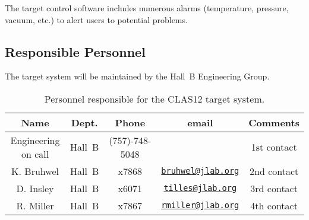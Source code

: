 The target control software includes numerous alarms (temperature, pressure, vacuum, etc.) 
to alert users to potential problems. 

\subsection{Responsible Personnel}

The target system will be maintained by the Hall~B Engineering Group.  

\begin{table}[!htb]
\centering
\begin{tabular}{|c|c|c|c|c|}
\hline
 Name&Dept.&Phone&email&Comments \\ \hline
Engineering on call & Hall~B&(757)-748-5048&& 1st contact  \\ \hline
K. Bruhwel& Hall~B&x7868&\href{mailto:bruhwel@jlab.org}{\nolinkurl{bruhwel@jlab.org}}&2nd contact \\ \hline
D. Insley & Hall~B&x6071&\href{mailto:tilles@jlab.org}{\nolinkurl{tilles@jlab.org}}  &3rd contact \\ \hline
R. Miller &Hall~B&x7867&\href{mailto:rmiller@jlab.org}{\nolinkurl{rmiller@jlab.org}} &4th contact \\ \hline
\end{tabular}
\caption{Personnel responsible for the CLAS12 target system.} 
\label{tb:target}
\end{table}
